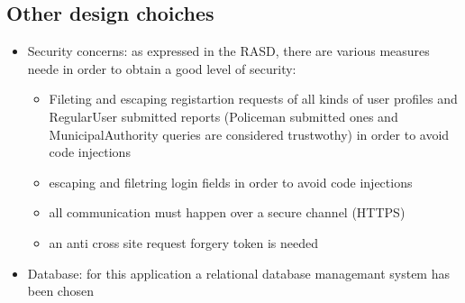 \subsection{Other design choiches}
\begin{itemize}
	\item Security concerns: as expressed in the RASD, there are various measures neede in order to obtain a good level of security:
	\begin{itemize}
		\item Fileting and escaping registartion requests of all kinds of user profiles and RegularUser submitted reports (Policeman submitted ones and MunicipalAuthority queries are considered trustwothy) in order to avoid code injections
		\item escaping and filetring login fields in order to avoid code injections
		\item all communication must happen over a secure channel (HTTPS)
		\item an anti cross site request forgery token is needed 
	\end{itemize}
	\item Database: for this application a relational database managemant system has been chosen
\end{itemize}